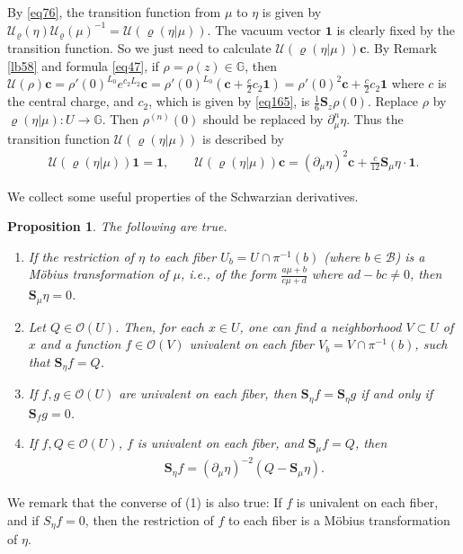 \documentclass[12pt,a4paper,notitlepage]{report}
\theoremstyle{definition}
\theoremstyle{plain}
\newtheorem{pp}[df]{Proposition}
\newcommand{\mc}{\mathcal}
\newcommand{\id}{\mathbf{1}}
\newcommand{\scr}{\mathscr}
\newcommand{\Gbb}{\mathbb G}
\newcommand{\cbf}{\mathbf c}
\newcommand{\Sbf}{\mathbf{S}}
\numberwithin{equation}{section}
\begin{document}
By \eqref{eq76}, the transition function from $\mu$ to $\eta$ is given by $\mc U_\varrho(\eta)\mc U_\varrho(\mu)^{-1}=\mc U(\varrho(\eta|\mu))$. The vacuum vector $\id$ is clearly fixed by the transition function. So we just need to calculate $\mc U(\varrho(\eta|\mu))\cbf$. By Remark \ref{lb58} and formula \eqref{eq47}, if $\rho=\rho(z)\in\Gbb$, then $\mc U(\rho)\cbf=\rho'(0)^{L_0}e^{c_2L_2}\cbf=\rho'(0)^{L_0}(\cbf+\frac c2c_2\id)=\rho'(0)^2\cbf+\frac c2c_2\id$ where $c$ is the central charge, and $c_2$, which is given by \eqref{eq165}, is $\frac 16\Sbf_z\rho(0)$. Replace $\rho$ by $\varrho(\eta|\mu):U\rightarrow\Gbb$. Then $\rho^{(n)}(0)$ should be replaced by $\partial_\mu^n\eta$. Thus the transition function $\mc U(\varrho(\eta|\mu))$  is described by
\begin{gather}
\mc U(\varrho(\eta|\mu))\id=\id,\qquad  \mc U(\varrho(\eta|\mu))\cbf=(\partial_\mu\eta)^2\cbf+\frac {c}{12}\Sbf_\mu\eta \cdot \id.\label{eq169}
\end{gather}



We collect some useful properties of the Schwarzian derivatives.  

\begin{pp}\label{lb70}
The following are true.
\begin{enumerate}[label=(\arabic*)]
\item If the restriction of $\eta$ to each fiber $U_b=U\cap\pi^{-1}(b)$ (where $b\in\mc B$) is a M\"obius transformation of $\mu$, i.e., of the form $\frac{a\mu+b}{c\mu+d}$ where $ad-bc\neq 0$, then $\Sbf_\mu \eta=0$.
\item  Let $Q\in\scr O(U)$. Then, for each $x\in U$, one can find a neighborhood $V\subset U$ of $x$ and a function $f\in\scr O(V)$ univalent on each fiber $V_b=V\cap\pi^{-1}(b)$, such that $\Sbf_\eta f=Q$.
\item If $f,g\in\scr O(U)$ are univalent on each fiber, then $\Sbf_\eta f=\Sbf_\eta g$ if and only if $\Sbf_f g=0$.

\item If $f,Q\in\scr O(U)$, $f$ is univalent on each fiber, and $\Sbf_\mu f=Q$, then 
\begin{align}
\Sbf_\eta f=(\partial_\mu\eta)^{-2}(Q-\Sbf_\mu \eta).\label{eq172}
\end{align}
\end{enumerate}
\end{pp}

We remark that the converse of (1) is also true: If $f$ is univalent on each fiber, and if $S_\eta f=0$, then the restriction of $f$ to each fiber is a M\"obius transformation of $\eta$.
\end{document}
